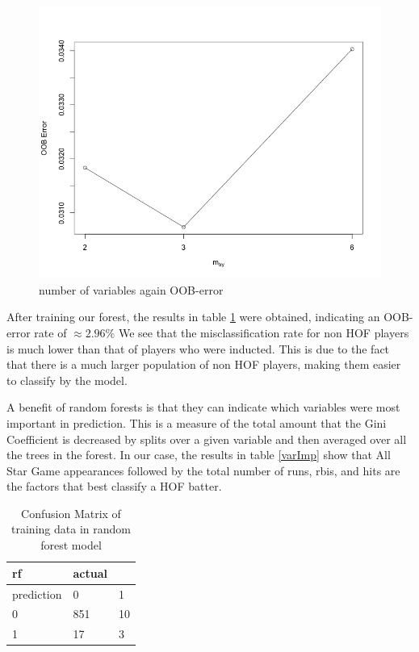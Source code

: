 \documentclass[preprint,12pt]{elsarticle}
\begin{document}
\begin{figure}[h]
       \centering 
       \includegraphics[width=0.8\linewidth]{mtry}
       \caption{number of variables again OOB-error}
       \label{mtry}
 \end{figure}

After training our forest, the results in table \ref{rfconf} were obtained, indicating an OOB-error rate of $\approx 2.96\%$ We see that the misclassification rate for non HOF players is much lower than that of players who were inducted. This is due to the fact that there is a much larger population of non HOF players, making them easier to classify by the model. 

A benefit of random forests is that they can indicate which variables were most important in prediction. This is a measure of the total amount that the Gini Coefficient is decreased by splits over a given variable and then averaged over all the trees in the forest. In our case, the results in table \ref{varImp} show that All Star Game appearances followed by the total number of runs, rbis, and hits are the factors that best classify a HOF batter.

\begin{table}[h]
\centering
\begin{tabular}{|l |l l|}
\hline
 rf &  actual & \\
\hline
prediction & 0 & 1 \\
0 & 851 & 10 \\
1 & 17 & 3 \\
\hline
\end{tabular}
\caption{Confusion Matrix of training data in random forest model}
\label{rfconf}
\end{table}
\end{document}
